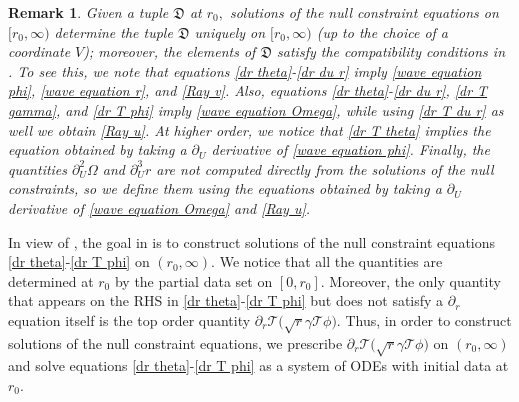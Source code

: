 \documentclass[11pt]{article}
\newtheorem{remark}{Remark}[section]
\numberwithin{equation}{section}
\begin{document}
\begin{remark}\label{solving compatibility conditions remark}
    Given a tuple $\mathfrak{D}$ at $r_0,$ solutions of the null constraint equations on $[r_0,\infty)$ determine the tuple $\mathfrak{D}$ uniquely on $[r_0,\infty)$ (up to the choice of a coordinate $V$); moreover, the elements of $\mathfrak{D}$ satisfy the compatibility conditions in . To see this, we note that equations \eqref{dr theta}-\eqref{dr du r} imply \eqref{wave equation phi}, \eqref{wave equation r}, and \eqref{Ray v}. Also, equations \eqref{dr theta}-\eqref{dr du r}, \eqref{dr T gamma}, and \eqref{dr T phi} imply \eqref{wave equation Omega}, while using \eqref{dr T du r} as well we obtain \eqref{Ray u}. At higher order, we notice that \eqref{dr T theta} implies the equation obtained by taking a $\partial_U$ derivative of \eqref{wave equation phi}. Finally, the quantities $\partial_U^2\Omega$ and $\partial_U^3r$ are not computed directly from the solutions of the null constraints, so we define them using the equations obtained by taking a $\partial_U$ derivative of \eqref{wave equation Omega} and \eqref{Ray u}.
\end{remark}

In view of , the goal in  is to construct solutions of the null constraint equations \eqref{dr theta}-\eqref{dr T phi} on $(r_0,\infty).$ We notice that all the quantities are determined at $r_0$ by the partial data set on $[0,r_0]$. Moreover, the only quantity that appears on the RHS in \eqref{dr theta}-\eqref{dr T phi} but does not satisfy a $\partial_r$ equation itself is the top order quantity $\partial_r\mathcal{T}\big(\sqrt{r}\gamma\mathcal{T}\phi\big).$ Thus, in order to construct solutions of the null constraint equations, we prescribe $\partial_r\mathcal{T}\big(\sqrt{r}\gamma\mathcal{T}\phi\big)$ on $(r_0,\infty)$ and solve equations \eqref{dr theta}-\eqref{dr T phi} as a system of ODEs with initial data at $r_0.$
\end{document}
